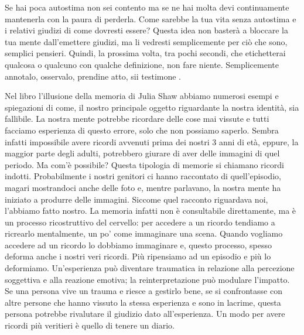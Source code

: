 \documentclass[12pt]{book} %
\begin{document}
Se hai poca autostima non sei contento ma se ne hai molta devi continuamente mantenerla con la paura di perderla. Come
sarebbe la tua vita senza autostima e i relativi giudizi di come dovresti essere? Questa idea non basterà a bloccare la
tua mente dall'emettere giudizi, ma li vedresti semplicemente per ciò che sono, semplici pensieri.
Quindi, la prossima volta, tra pochi secondi, che etichetterai qualcosa o qualcuno con qualche definizione, non fare
niente. Semplicemente annotalo, osservalo, prendine atto, sii
testimone
.

\begin{mdframed}[linewidth=1pt]
Nel libro l'illusione della memoria di Julia Shaw abbiamo numerosi esempi
e spiegazioni di come, il nostro principale oggetto riguardante la nostra identità, sia fallibile. La nostra mente
potrebbe ricordare delle cose mai vissute e tutti facciamo esperienza di questo errore, solo che non possiamo saperlo.
Sembra infatti impossibile avere ricordi avvenuti prima dei nostri 3 anni di età, eppure, la maggior parte degli adulti, potrebbero giurare
di aver delle immagini di quel periodo. Ma com'è possibile? Questa tipologia di memorie si
chiamano ricordi indotti. Probabilmente i nostri genitori ci hanno raccontato di quell'episodio,
magari mostrandoci anche delle foto e, mentre parlavano, la nostra mente ha iniziato a produrre delle immagini. Siccome
quel racconto riguardava noi, l'abbiamo fatto nostro. La memoria infatti non è consultabile direttamente, ma è un processo ricostruttivo del cervello: per accedere a un ricordo tendiamo a ricrearlo mentalmente, un po’ come immaginare una scena. Quando vogliamo accedere ad un ricordo lo dobbiamo immaginare e, questo processo, spesso deforma anche i nostri veri ricordi. Più
ripensiamo ad un episodio e più lo deformiamo. Un’esperienza può diventare traumatica in relazione alla percezione soggettiva e alla reazione emotiva; la reinterpretazione può modulare l’impatto. Se una persona vive un trauma e riesce a gestirlo bene, se si confrontasse con altre persone che hanno
vissuto la stessa esperienza e sono in lacrime, questa persona potrebbe rivalutare il giudizio dato all'esperienza. Un
modo per avere ricordi più veritieri è quello di tenere un diario.


\end{mdframed}
\end{document}
